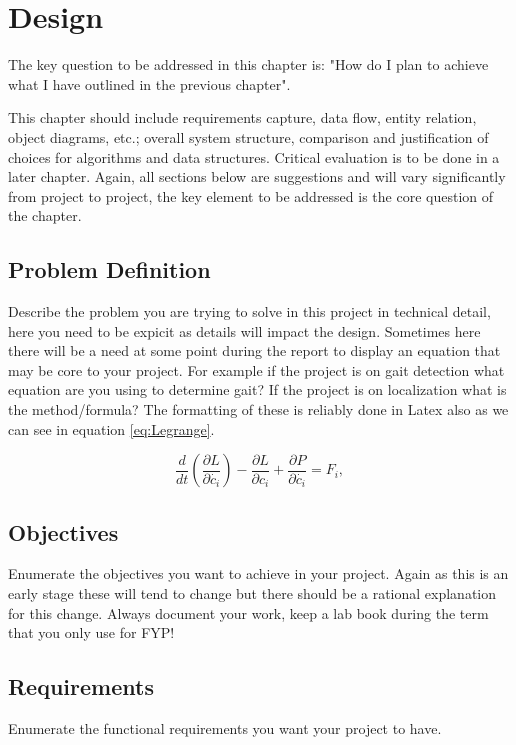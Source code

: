 \chapter{Design}
\label{chap:design}
The key question to be addressed in this chapter is: "How do I plan to achieve what I have outlined in the previous chapter". 

This chapter should include requirements capture, data flow, entity relation, object diagrams, etc.; overall system structure, comparison and justification of choices for algorithms and data structures. Critical evaluation is to be done in a later chapter. Again, all sections below are suggestions and will vary significantly from project to project, the key element to be addressed is the core question of the chapter.

\section{Problem Definition}
Describe the problem you are trying to solve in this project in technical detail, here you need to be expicit as details will impact the design. Sometimes here there will be a need at some point during the report to display an equation that may be core to your project. For example if the project is on gait detection what equation are you using to determine gait? If the project is on localization what is the method/formula? The formatting of these is reliably done in Latex also as we can see in equation \ref{eq:Legrange}.

\begin{equation}
\frac{d}{dt}(\frac{\partial L}{\partial \dot{c_i}})-\frac{\partial L}{\partial c_i}+\frac{\partial P}{\partial \dot{c_i}} = F_i,
\label{eq:Legrange}
\end{equation}

\section{Objectives}
Enumerate the objectives you want to achieve in your project. Again as this is an early stage these will tend to change but there should be a rational explanation for this change. Always document your work, keep a lab book during the term that you only use for FYP!

\section{Requirements}
Enumerate the functional requirements you want your project to have. 


